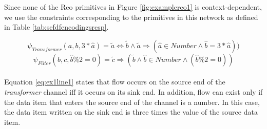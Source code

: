   Since none of the Reo primitives in Figure \ref{fig:examplereo1} is context-dependent, we use the constraints corresponding to the primitives in this network as defined in Table \ref{tab:scfdfencodingsrcsp}.
  
    \begin{equation}
       \label{eq:ex1line1}
       \psi_{Transformer}(a,b,3*\hat{a})=\tilde{a}\Leftrightarrow\tilde{b}\wedge\tilde{a}\Rightarrow(\hat{a}\in Number\wedge \hat{b}=3*\hat{a}))
       \end{equation} %
              \begin{equation}
                \label{eq:ex1line4}
                \psi_{Filter}(b,c,\hat{b}\%2=0)=\tilde{c}\Rightarrow(\tilde{b}\wedge\hat{b}\in Number\wedge(\hat{b}\%2=0))
                \end{equation} \\ %
       
   Equation \ref{eq:ex1line1} states that flow occurs on the source end of the \emph{transformer} channel iff it occurs on its sink end. In addition, flow can exist only if the data item that enters the source end of the channel is a number. In this case, the data item written on the sink end is three times the value of the source data item.  


